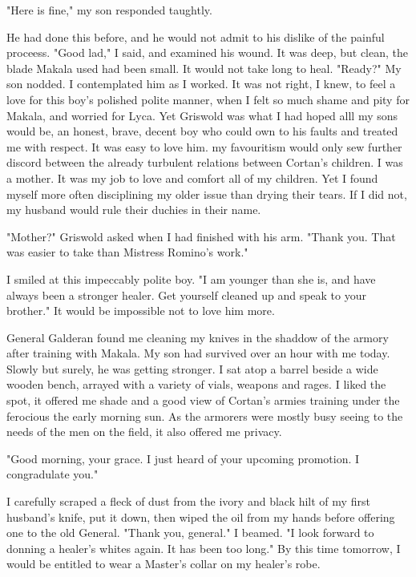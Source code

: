 \documentclass{article}
\begin{document}
"Here is fine," my son responded taughtly. 

He had done this before, and he would not admit to his dislike of the painful proceess. "Good lad," I said, and examined his wound. It was deep, but clean, the blade Makala used had been small. It would not take long to heal. "Ready?" My son nodded. I contemplated him as I worked. It was not right, I knew, to feel a love for this boy's polished polite manner, when I felt so much shame and pity for Makala, and worried for Lyca. Yet Griswold was what I had hoped alll my sons would be, an honest, brave, decent boy who could own to his faults and treated me with respect. It was easy to love him. my favouritism would only sew further discord between the already turbulent relations between Cortan's children. I was a mother. It was my job to love and comfort all of my children. Yet I found myself more often disciplining my older issue than drying their tears. If I did not, my husband would rule their duchies in their name. 

"Mother?" Griswold asked when I had finished with his arm. "Thank you. That was easier to take than Mistress Romino's work." 

I smiled at this impeccably polite boy. "I am younger than she is, and have always been a stronger healer. Get yourself cleaned up and speak to your brother." It would be impossible not to love him more.

\vspace{.5cm}

General Galderan found me cleaning my knives in the shaddow of the armory after training with Makala. My son had survived over an hour with me today. Slowly but surely, he was getting stronger. I sat atop a barrel beside a wide wooden bench, arrayed with a variety of vials, weapons and rages. I liked the spot, it offered me shade and a good view of Cortan's armies training under the ferocious the early morning sun. As the armorers were mostly busy seeing to the needs of the men on the field, it also offered me privacy.

"Good morning, your grace. I just heard of your upcoming promotion. I congradulate you."

I carefully scraped a fleck of dust from the ivory and black hilt of my first husband's knife, put it down, then wiped the oil from my hands before offering one to the old General. "Thank you, general." I beamed. "I look forward to donning a healer's whites again. It has been too long." By this time tomorrow, I would be entitled to wear a Master's collar on my healer's robe.
\end{document}
